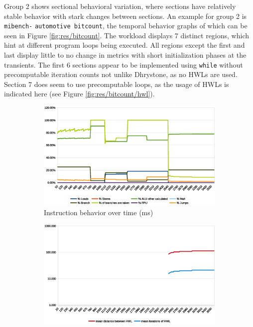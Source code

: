 \documentclass[../bachelor_paper.tex]{subfiles}
\begin{document}
Group 2 shows sectional behavioral variation, where sections have relatively stable behavior with stark changes between sections. An example for group 2 is \texttt{mibench-} \texttt{automotive bitcount}, the temporal behavior graphs of which can be seen in Figure \ref{fig:res/bitcount}. The workload displays 7 distinct regions, which hint at different program loops being executed. All regions except the first and last display little to no change in metrics with short initialization phases at the transients. The first 6 sections appear to be implemented using \texttt{while} without precomputable iteration counts not unlike Dhrystone, as no \acp{HWL} are used. Section 7 does seem to use precomputable loops, as the usage of \acp{HWL} is indicated here (see Figure \ref{fig:res/bitcount/hwl}).

\begin{figure}
    \centering
    \begin{subfigure}{\textwidth}
        \centering
        \includegraphics[height=0.26\textheight]{img/graph/mibench/bitcount_inst.eps}
        \caption{Instruction behavior over time (ms)}
        \label{fig:res/bitcount/inst}
    \end{subfigure}
    \begin{subfigure}{\textwidth}
        \centering
        \includegraphics[height=0.26\textheight]{img/graph/mibench/bitcount_hwl.eps}

\end{subfigure}
\end{figure}
\end{document}
